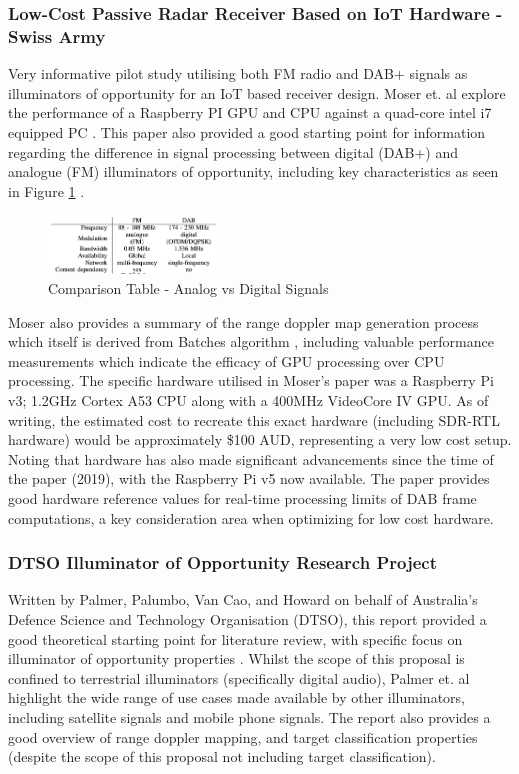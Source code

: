 \documentclass[12pt,a4paper]{article}
\begin{document}
\subsubsection{Low-Cost Passive Radar Receiver Based on IoT Hardware - Swiss Army}
Very informative pilot study utilising both FM radio and DAB+ signals as illuminators of opportunity for an IoT based receiver design. Moser et. al explore the performance of a Raspberry PI GPU and CPU against a quad-core intel i7 equipped PC \cite{IOTpassiveRadar}. This paper also provided a good starting point for information regarding the difference in signal processing between digital (DAB+) and analogue (FM) illuminators of opportunity, including key characteristics as seen in Figure \ref{fig:signals} . 

\begin{figure}[htbp]
    \centering
    \includegraphics[width=0.4\textwidth]{digAnalog.png}
    \caption{Comparison Table - Analog vs Digital Signals \cite{IOTpassiveRadar}}
    \label{fig:signals}
\end{figure}

\par \vspace{0.5cm} 
\noindent Moser also provides a summary of the range doppler map generation process which itself is derived from Batches algorithm \cite{DSPfm}, including valuable performance measurements which indicate the efficacy of GPU processing over CPU processing.  The specific hardware utilised in Moser's paper was a Raspberry Pi v3; 1.2GHz Cortex A53 CPU along with a 400MHz VideoCore IV GPU. As of writing, the estimated cost to recreate this exact hardware (including SDR-RTL hardware) would be approximately \$100 AUD, representing a very low cost setup. Noting that hardware has also made significant advancements since the time of the paper (2019), with the Raspberry Pi v5 now available. The paper provides good hardware reference values for real-time processing limits of DAB frame computations, a key consideration area when optimizing for low cost hardware. 

\subsubsection{DTSO Illuminator of Opportunity Research Project}
Written by Palmer, Palumbo, Van Cao, and Howard on behalf of Australia's Defence Science and Technology Organisation (DTSO), this report provided a good theoretical starting point for literature review, with specific focus on illuminator of opportunity properties \cite{DTSO2009}. Whilst the scope of this proposal is confined to terrestrial illuminators (specifically digital audio), Palmer et. al highlight the wide range of use cases made available by other illuminators, including satellite signals and mobile phone signals. The report also provides a good overview of range doppler mapping, and target classification properties (despite the scope of this proposal not including target classification).
\end{document}
